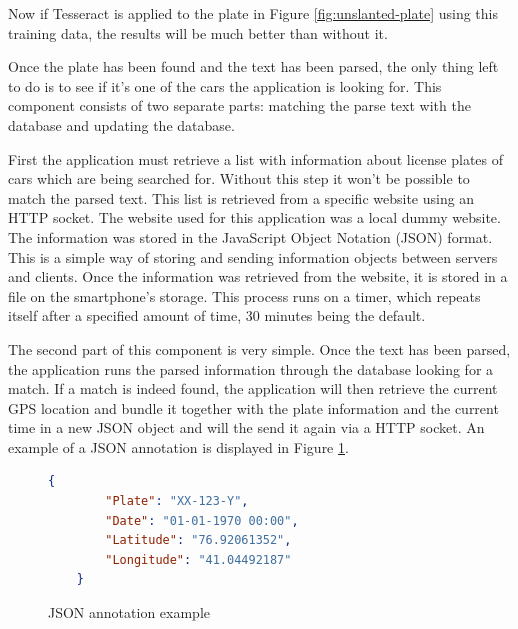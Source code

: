 Now if Tesseract is applied to the plate in Figure \ref{fig:unslanted-plate} using this training data, the results will be much better than without it.


Once the plate has been found and the text has been parsed, the only thing left to do is to see if it's one of the cars the application is looking for. This component consists of two separate parts: matching the parse text with the database and updating the database.

First the application must retrieve a list with information about license plates of cars which are being searched for. Without this step it won't be possible to match the parsed text. This list is retrieved from a specific website using an HTTP socket. The website used for this application was a local dummy website. The information was stored in the JavaScript Object Notation (JSON) format. This is a simple way of storing and sending information objects between servers and clients. Once the information was retrieved from the website, it is stored in a file on the smartphone's storage. This process runs on a timer, which repeats itself after a specified amount of time, 30 minutes being the default.

The second part of this component is very simple. Once the text has been parsed, the application runs the parsed information through the database looking for a match. If a match is indeed found, the application will then retrieve the current GPS location and bundle it together with the plate information and the current time in a new JSON object and will the send it again via a HTTP socket. An example of a JSON annotation is displayed in Figure \ref{fig:json}.

\begin{figure}
    \begin{lstlisting}[language=json]
    { 
        "Plate": "XX-123-Y",
        "Date": "01-01-1970 00:00",
        "Latitude": "76.92061352",
        "Longitude": "41.04492187" 
    }
    \end{lstlisting}
    \caption{JSON annotation example}
    \label{fig:json}
\end{figure}


